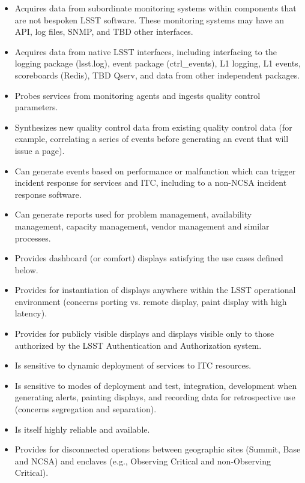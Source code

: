\begin{itemize}

\item Acquires data from subordinate monitoring systems within components that
are not bespoken LSST software. These monitoring systems may have an API, log
files, SNMP, and TBD other interfaces.

\item Acquires data from native LSST interfaces, including interfacing to the
logging package (lsst.log), event package (ctrl\_events), L1 logging, L1 events,
scoreboards (Redis), TBD Qserv, and data from other independent packages.

\item Probes services from monitoring agents and ingests quality control
parameters.

\item Synthesizes new quality control data from existing quality control data
(for example, correlating a series of events before generating an event that
will issue a page).

\item Can generate events based on performance or malfunction which can trigger
incident response for services and ITC, including to a non-NCSA incident
response software.

\item Can generate reports used for problem management, availability management,
capacity management, vendor management and similar processes.

\item Provides dashboard (or comfort) displays satisfying the use cases defined
below.

\item Provides for instantiation of displays anywhere within the LSST
operational environment (concerns porting vs. remote display, paint display with
high latency).

\item Provides for publicly visible displays and displays visible only to those
authorized by the LSST Authentication and Authorization system.

\item Is sensitive to dynamic deployment of services to ITC resources.

\item Is sensitive to modes of deployment and test, integration, development
when generating alerts, painting displays, and recording data for retrospective
use (concerns segregation and separation).

\item Is itself highly reliable and available.

\item Provides for disconnected operations between geographic sites (Summit,
Base and NCSA) and enclaves (e.g., Observing Critical and non-Observing
Critical).

\end{itemize}

